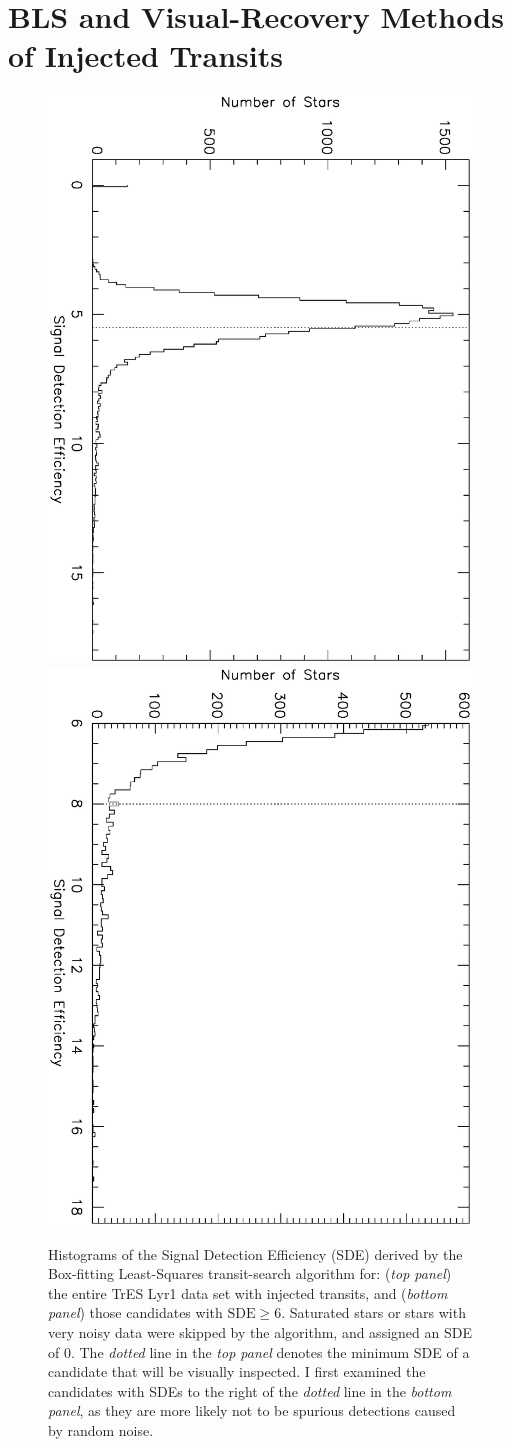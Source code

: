 \section{BLS and Visual-Recovery Methods of Injected Transits}
\label{cha:human:sec:rec}

\begin{figure}
\begin{center}
\centering
\includegraphics[width=.55\textwidth, angle=90]{7_sde_a}\\
\includegraphics[width=.55\textwidth, angle=90]{7_sde_b}\\
\caption[Histograms of BLS SDEs for fake data set]{%
Histograms of the Signal Detection Efficiency (SDE) derived by the Box-fitting Least-Squares transit-search algorithm for: %
({\it top panel}) the entire TrES Lyr1 data set with injected transits, and %
({\it bottom panel}) those candidates with $\mathrm{SDE}\geq6$.
Saturated stars or stars with very noisy data were skipped by the algorithm, and assigned an SDE of 0.
The {\it dotted} line in the {\it top panel} denotes the minimum SDE of a candidate that will be visually inspected. 
I first examined the candidates with SDEs to the right of the {\it dotted} line in the {\it bottom panel}, as they are more likely not to be spurious detections caused by random noise. 
}
\label{cha:human:sec:model:fig:sde}
\end{center}
\end{figure}


